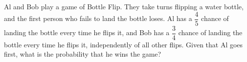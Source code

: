 Al and Bob play a game of Bottle Flip. They take turns flipping a water bottle, and the first person who fails to land the bottle loses. Al has a $\dfrac{4}{5}$ chance of landing the bottle every time he flips it, and Bob has a $\dfrac{3}{4}$ chance of landing the bottle every time he flips it, independently of all other flips. Given that Al goes first, what is the probability that he wins the game?

